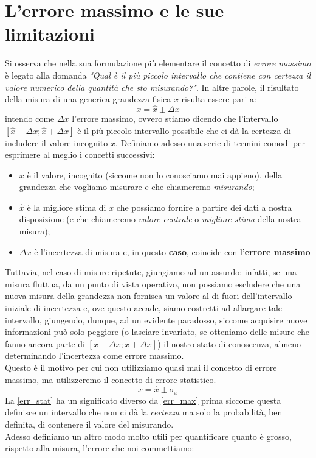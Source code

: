 \documentclass{report}
\begin{document}
	\section{L'errore massimo e le sue limitazioni}
	Si osserva che nella sua formulazione più elementare il concetto di \emph{errore massimo} è legato alla domanda \emph{"Qual è il più piccolo intervallo che contiene con certezza il valore numerico della quantità che sto misurando?"}. In altre parole, il risultato della misura di una generica grandezza fisica $x$ risulta essere pari a:
	\begin{equation}
		x = \hat{x} \pm \Delta x
		\label{err_max}
	\end{equation}
	intendo come $\Delta x$ l'errore massimo\ignorespaces, ovvero stiamo dicendo che l'intervallo $[\hat{x} - \Delta x; \hat{x} + \Delta x]$ è il più piccolo intervallo possibile che ci dà la certezza di includere il valore incognito $x$. Definiamo adesso una serie di termini comodi per esprimere al meglio i concetti successivi:
	\begin{itemize}
		\item $x$ è il valore, incognito (siccome non lo conosciamo mai appieno), della grandezza che vogliamo misurare e che chiameremo \emph{misurando};
		\item $\hat{x}$ è la migliore stima di $x$ che possiamo fornire a partire dei dati a nostra disposizione (e che chiameremo \emph{valore centrale} o \emph{migliore stima} della nostra misura);
		\item $\Delta x$ è l'incertezza di misura e, in questo \textbf{caso}, coincide con l'\textbf{errore massimo}
	\end{itemize}
	Tuttavia, nel caso di misure ripetute, giungiamo ad un assurdo: infatti, se una misura fluttua, da un punto di vista operativo, non possiamo escludere che una nuova misura della grandezza non fornisca un valore al di fuori dell'intervallo iniziale di incertezza e, ove questo accade, siamo costretti ad allargare tale intervallo, giungendo, dunque, ad un evidente paradosso, siccome acquisire nuove informazioni può solo peggiore (o lasciare invariato, se otteniamo delle misure che fanno ancora parte di $[x-\Delta x; x + \Delta x]$) il nostro stato di conoscenza, almeno determinando l'incertezza come errore massimo. \\
	Questo è il motivo per cui non utilizziamo quasi mai il concetto di errore massimo, ma utilizzeremo il concetto di errore statistico.
	\begin{equation}
		x = \hat{x} \pm \sigma_x
		\label{err_stat}
	\end{equation}
	La \ref{err_stat} ha un significato diverso da \ref{err_max} prima siccome questa definisce un intervallo che non ci dà la \emph{certezza} ma solo la probabilità, ben definita, di contenere il valore del misurando. \\
	Adesso definiamo un altro modo molto utili per quantificare quanto è grosso, rispetto alla misura, l'errore che noi commettiamo:
\end{document}
